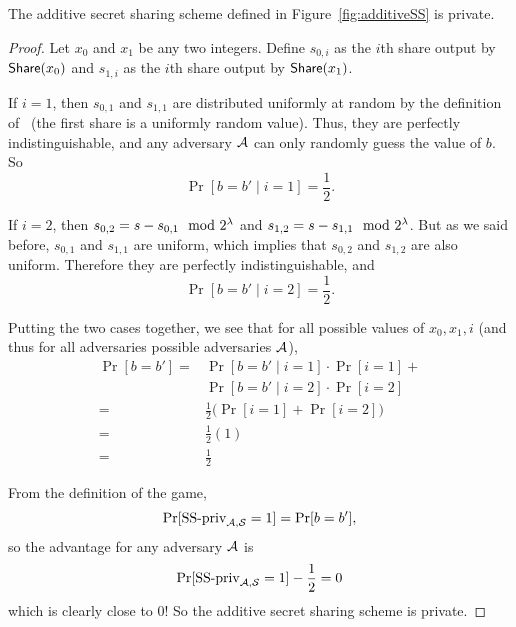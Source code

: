 \begin{theorem}
    The additive secret sharing scheme defined in Figure~\ref{fig:additiveSS}
    is private.
\end{theorem}
\begin{proof}
    Let $x_0$ and $x_1$ be any two integers. Define $s_{0,i}$ as
    the $i$th share output by $\mathsf{Share}(x_0)$ and $s_{1,i}$ as the 
    $i$th share output by $\mathsf{Share}(x_1)$. 

    If $i=1$, then $s_{0,1}$ and $s_{1,1}$ are distributed uniformly 
    at random by the definition of \share~(the first share is 
    a uniformly random value). Thus, they are perfectly indistinguishable,
    and any adversary $\mathcal{A}$ can only randomly guess the value of $b$.
    So
    \[
        \Pr[b=b' \mid i=1] = \frac{1}{2}.
    \]

    If $i=2$, then $s_{0,2} = s-s_{0,1} \mod 2^\lambda$ and $s_{1,2} = 
    s-s_{1,1} \mod 2^\lambda$.
    But as we said before, $s_{0,1}$ and $s_{1,1}$ are uniform,
    which implies that $s_{0,2}$ and $s_{1,2}$ are also uniform.
    Therefore they are perfectly indistinguishable, and 
    \[
        \Pr[b=b' \mid i=2] = \frac{1}{2}.
    \]

    Putting the two cases together, we see that for all possible 
    values of $x_0, x_1, i$ (and thus for all adversaries possible
    adversaries $\mathcal{A}$),
    \begin{align*}
        \Pr[b=b']
        =& \Pr[b=b' \mid i=1]\cdot\Pr[i=1] + \\
        & \Pr[b=b' \mid i=2]\cdot\Pr[i=2]\\
        =& \frac{1}{2} \big(\Pr[i=1]+\Pr[i=2]\big)\\
        =& \frac{1}{2}(1)\\
        =& \frac{1}{2}
    \end{align*}

    From the definition of the game, 
    \[
        \Pr[\text{SS-priv}_{\mathcal{A},\mathcal{S}}=1] = \Pr[b=b'],
    \]
    so the advantage for any adversary $\mathcal{A}$ is
    \[
        \Pr[\text{SS-priv}_{\mathcal{A},\mathcal{S}}=1] - \frac{1}{2} = 0
    \]
    which is clearly close to 0! So the additive secret sharing 
    scheme is private.
\end{proof}
